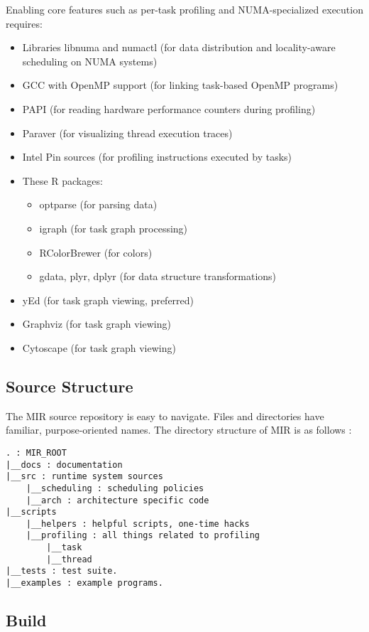 \documentclass[11pt,a4paper]{article}
\begin{document}
Enabling core features such as per-task profiling and NUMA-specialized execution requires:

\begin{itemize}
\item Libraries libnuma and numactl (for data distribution and locality-aware scheduling on NUMA systems)
\item GCC with OpenMP support (for linking task-based OpenMP programs)
\item PAPI (for reading hardware performance counters during profiling)
\item Paraver (for visualizing thread execution traces)
\item Intel Pin sources (for profiling instructions executed by tasks)
\item These R packages:
  \begin{itemize}
  \item optparse (for parsing data)
  \item igraph (for task graph processing)
  \item RColorBrewer (for colors)
  \item gdata, plyr, dplyr (for data structure transformations)
  \end{itemize}
\item yEd (for task graph viewing, preferred)
\item Graphviz (for task graph viewing)
\item Cytoscape (for task graph viewing)
\end{itemize}

\subsection{Source Structure}\label{source-structure}

The MIR source repository is easy to navigate. Files and directories have familiar, purpose-oriented names. The directory structure of MIR is as follows :

\begin{lstlisting}[style=MyInputStyle]
. : MIR_ROOT
|__docs : documentation
|__src : runtime system sources
    |__scheduling : scheduling policies
    |__arch : architecture specific code
|__scripts
    |__helpers : helpful scripts, one-time hacks
    |__profiling : all things related to profiling
        |__task
        |__thread
|__tests : test suite.
|__examples : example programs.
\end{lstlisting}

\subsection{Build}\label{build}
\end{document}
